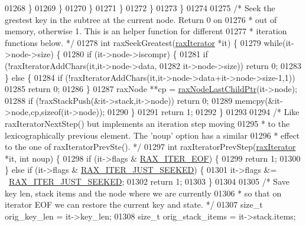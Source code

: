 \begin{DoxyCode}
{{{{{{{{{{{{{{{{{{{01268                     \}
01269                 \}
01270             \}
01271         \}
01272     \}
01273 \}
01274 
01275 \textcolor{comment}{/* Seek the grestest key in the subtree at the current node. Return 0 on}
01276 \textcolor{comment}{ * out of memory, otherwise 1. This is an helper function for different}
01277 \textcolor{comment}{ * iteration functions below. */}
01278 \textcolor{keywordtype}{int} raxSeekGreatest(\hyperlink{structraxIterator}{raxIterator} *it) \{
01279     \textcolor{keywordflow}{while}(it->node->size) \{
01280         \textcolor{keywordflow}{if} (it->node->iscompr) \{
01281             \textcolor{keywordflow}{if} (!raxIteratorAddChars(it,it->node->data,
01282                 it->node->size)) \textcolor{keywordflow}{return} 0;
01283         \} \textcolor{keywordflow}{else} \{
01284             \textcolor{keywordflow}{if} (!raxIteratorAddChars(it,it->node->data+it->node->size-1,1))
01285                 \textcolor{keywordflow}{return} 0;
01286         \}
01287         raxNode **cp = \hyperlink{rax_8c_a2c5310b0d00672508a8f935a7109f4ce}{raxNodeLastChildPtr}(it->node);
01288         \textcolor{keywordflow}{if} (!raxStackPush(&it->stack,it->node)) \textcolor{keywordflow}{return} 0;
01289         memcpy(&it->node,cp,\textcolor{keyword}{sizeof}(it->node));
01290     \}
01291     \textcolor{keywordflow}{return} 1;
01292 \}
01293 
01294 \textcolor{comment}{/* Like raxIteratorNextStep() but implements an iteration step moving}
01295 \textcolor{comment}{ * to the lexicographically previous element. The 'noup' option has a similar}
01296 \textcolor{comment}{ * effect to the one of raxIteratorPrevSte(). */}
01297 \textcolor{keywordtype}{int} raxIteratorPrevStep(\hyperlink{structraxIterator}{raxIterator} *it, \textcolor{keywordtype}{int} noup) \{
01298     \textcolor{keywordflow}{if} (it->flags & \hyperlink{rax_8h_a4fb08a914b84ba0a39daa86297176e1c}{RAX\_ITER\_EOF}) \{
01299         \textcolor{keywordflow}{return} 1;
01300     \} \textcolor{keywordflow}{else} \textcolor{keywordflow}{if} (it->flags & \hyperlink{rax_8h_a665a029bbb4c6864ca2153b3ba3b746c}{RAX\_ITER\_JUST\_SEEKED}) \{
01301         it->flags &= ~\hyperlink{rax_8h_a665a029bbb4c6864ca2153b3ba3b746c}{RAX\_ITER\_JUST\_SEEKED};
01302         \textcolor{keywordflow}{return} 1;
01303     \}
01304 
01305     \textcolor{comment}{/* Save key len, stack items and the node where we are currently}
01306 \textcolor{comment}{     * so that on iterator EOF we can restore the current key and state. */}
01307     size\_t orig\_key\_len = it->key\_len;
01308     size\_t orig\_stack\_items = it->stack.items;
}}}}}}}}}}}}}}}}}}}
\end{DoxyCode}
